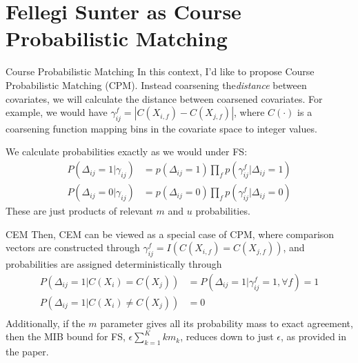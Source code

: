 \documentclass{beamer}
\begin{document}
\section{Fellegi Sunter as Course Probabilistic Matching}

\begin{frame}{Course Probabilistic Matching}
	In this context, I'd like to propose Course Probabilistic Matching (CPM). Instead coarsening the\emph{distance} between covariates, we will calculate the distance between coarsened covariates. For example, we would have $\gamma_{ij}^f = |C(X_{i, f}) - C(X_{j, f})|$, where $C(\cdot)$ is a coarsening function mapping bins in the covariate space to integer values. \linebreak
	
	We calculate probabilities exactly as we would under FS:
	\begin{align*}
		P(\Delta_{ij} = 1 | \gamma_{ij}) &= p(\Delta_{ij} = 1)\prod_f p(\gamma_{ij}^f|\Delta_{ij}= 1) \\
		P(\Delta_{ij} = 0 | \gamma_{ij}) &= p(\Delta_{ij} = 0)\prod_f p(\gamma_{ij}^f|\Delta_{ij}= 0)
	\end{align*}
These are just products of relevant $m$ and $u$ probabilities.
\end{frame}

\begin{frame}{CEM}
	Then, CEM can be viewed as a special case of CPM, where comparison vectors are constructed through $\gamma_{ij}^f = I(C(X_{i, f}) = C(X_{j, f}))$, and probabilities are assigned deterministically through \linebreak
\begin{align*}
	P(\Delta_{ij} = 1 | C(X_i) = C(X_j)) &= P(\Delta_{ij} = 1 |\gamma_{ij}^f = 1 , \forall f) = 1 \\
	P(\Delta_{ij} = 1 | C(X_i) \neq C(X_j)) &= 0 \\
\end{align*}
Additionally, if the $m$ parameter gives all its probability mass to exact agreement, then the MIB bound for FS,  $\epsilon \sum_{k=1}^K k m_k$,  reduces down to just $\epsilon$, as provided in the paper.
\end{frame}
\end{document}
